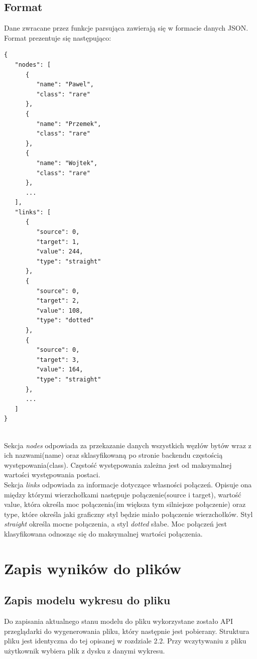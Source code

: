 \documentclass[12pt,a4paper]{article} %
\begin{document}
    \subsection{Format}
        Dane zwracane przez funkcje parsująca zawierają się w formacie danych JSON. Format prezentuje się następująco:
        \begin{lstlisting}
{
   "nodes": [
      {
         "name": "Pawel",
         "class": "rare"
      },
      {
         "name": "Przemek",
         "class": "rare"
      },
      {
         "name": "Wojtek",
         "class": "rare"
      },
      ...
   ],
   "links": [
      {
         "source": 0,
         "target": 1,
         "value": 244,
         "type": "straight"
      },
      {
         "source": 0,
         "target": 2,
         "value": 108,
         "type": "dotted"
      },
      {
         "source": 0,
         "target": 3,
         "value": 164,
         "type": "straight"
      },
      ...
   ]
}


        \end{lstlisting}
        
        Sekcja \textit{nodes} odpowiada za przekazanie danych wszystkich węzłów bytów wraz z ich nazwami(name) oraz sklasyfikowaną po stronie backendu częstością występowania(class). Częstość występowania zależna jest od maksymalnej wartości występowania postaci.\\
        
        Sekcja \textit{links} odpowiada za informacje dotyczące własności połączeń. Opisuje ona między którymi wierzchołkami następuje połączenie(source i target), wartość value, która określa moc połączenia(im większa tym silniejsze połączenie) oraz type, które określa jaki graficzny styl będzie miało połączenie wierzchołków. Styl \textit{straight} określa mocne połączenia, a styl \textit{dotted} słabe. Moc połączeń jest klasyfikowana odnosząc się do maksymalnej wartości połączenia.

\section{Zapis wyników do plików}

\subsection{Zapis modelu wykresu do pliku}

Do zapisania aktualnego stanu modelu do pliku wykorzystane zostało API przeglądarki do wygenerowania pliku, który następnie jest pobierany. Struktura pliku jest identyczna do tej opisanej w rozdziale 2.2. Przy wczytywaniu z pliku użytkownik wybiera plik z dysku z danymi wykresu.
\end{document}

